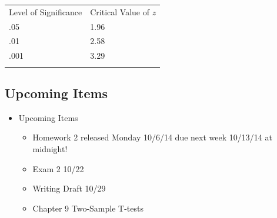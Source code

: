 \documentclass[]{article}
\begin{document}
\begin{longtable}[c]{@{}ll@{}}
\toprule\addlinespace
Level of Significance & Critical Value of $z$
\\\addlinespace
\midrule\endhead
.05 & 1.96
\\\addlinespace
.01 & 2.58
\\\addlinespace
.001 & 3.29
\\\addlinespace
\bottomrule
\end{longtable}

\subsection{Upcoming Items}\label{upcoming-items}

\begin{itemize}
\itemsep1pt\parskip0pt
\item
  Upcoming Items

  \begin{itemize}
  \itemsep1pt\parskip0pt
  \item
    Homework 2 released Monday 10/6/14 due next week 10/13/14 at
    midnight!
  \item
    Exam 2 10/22
  \item
    Writing Draft 10/29
  \item
    Chapter 9 Two-Sample T-tests
  \end{itemize}
\end{itemize}
\end{document}
